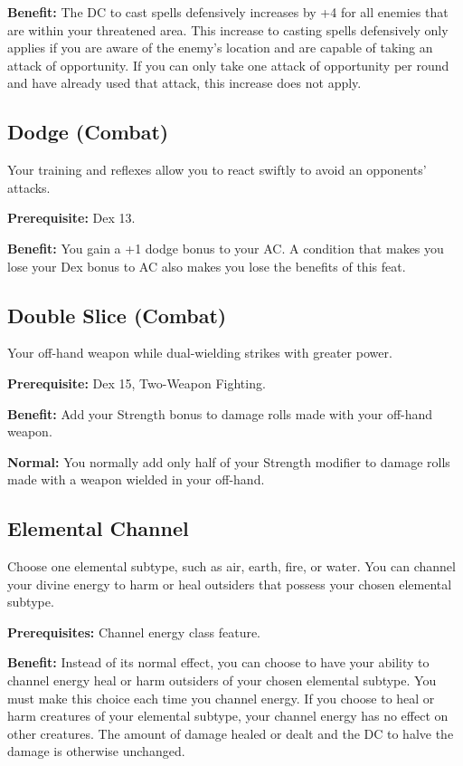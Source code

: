 \textbf{Benefit:} The DC to cast spells defensively increases by +4 for all enemies that are within your threatened area. This increase to casting spells defensively only applies if you are aware of the enemy's location and are capable of taking an attack of opportunity. If you can only take one attack of opportunity per round and have already used that attack, this increase does not apply.
				
\subsection{Dodge (Combat)}

				
Your training and reflexes allow you to react swiftly to avoid an opponents' attacks.
				
\textbf{Prerequisite:} Dex 13.
				
\textbf{Benefit:} You gain a +1 dodge bonus to your AC. A condition that makes you lose your Dex bonus to AC also makes you lose the benefits of this feat.
				
\subsection{Double Slice (Combat)}

				
Your off-hand weapon while dual-wielding strikes with greater power.
				
\textbf{Prerequisite:} Dex 15, Two-Weapon Fighting.
				
\textbf{Benefit:} Add your Strength bonus to damage rolls made with your off-hand weapon.
				
\textbf{Normal:} You normally add only half of your Strength modifier to damage rolls made with a weapon wielded in your off-hand.
				
\subsection{Elemental Channel}

				
Choose one elemental subtype, such as air, earth, fire, or water. You can channel your divine energy to harm or heal outsiders that possess your chosen elemental subtype.
				
\textbf{Prerequisites:} Channel energy class feature.
				
\textbf{Benefit:} Instead of its normal effect, you can choose to have your ability to channel energy heal or harm outsiders of your chosen elemental subtype. You must make this choice each time you channel energy. If you choose to heal or harm creatures of your elemental subtype, your channel energy has no effect on other creatures. The amount of damage healed or dealt and the DC to halve the damage is otherwise unchanged.
				
